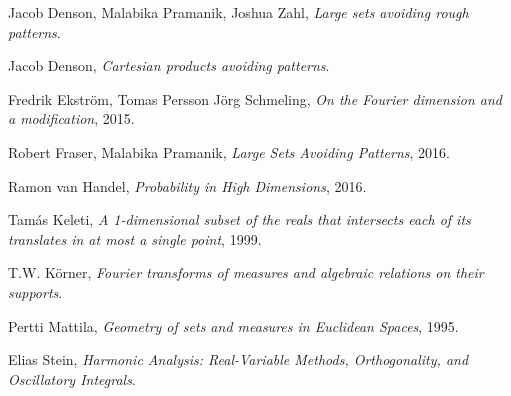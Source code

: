 \documentclass[dvipsnames,letterpaper,12pt]{article}
\numberwithin{equation}{section}
\numberwithin{theorem}{section}
\begin{document}
\begin{thebibliography}{9}

    Jacob Denson, Malabika Pramanik, Joshua Zahl,
    \textit{Large sets avoiding rough patterns}.

    Jacob Denson,
    \textit{Cartesian products avoiding patterns}.

    Fredrik Ekstr\"{o}m, Tomas Persson J\"{o}rg Schmeling,
    \textit{On the {F}ourier dimension and a modification},
    2015.

    Robert Fraser, Malabika Pramanik,
    \textit{Large Sets Avoiding Patterns},
    2016.


    Ramon van Handel,
    \textit{Probability in High Dimensions},
    2016.

    Tam\'{a}s Keleti,
    \textit{A 1-dimensional subset of the reals that intersects each of its translates in at most a single point},
    1999.


    T.W. K\"{o}rner,
    \textit{{F}ourier transforms of measures and algebraic relations on their supports}.

    Pertti Mattila,
    \emph{Geometry of sets and measures in {E}uclidean Spaces},
    1995.

    Elias Stein,
    \textit{Harmonic Analysis: Real-Variable Methods, Orthogonality, and Oscillatory Integrals}.


\end{thebibliography}




\end{document}
